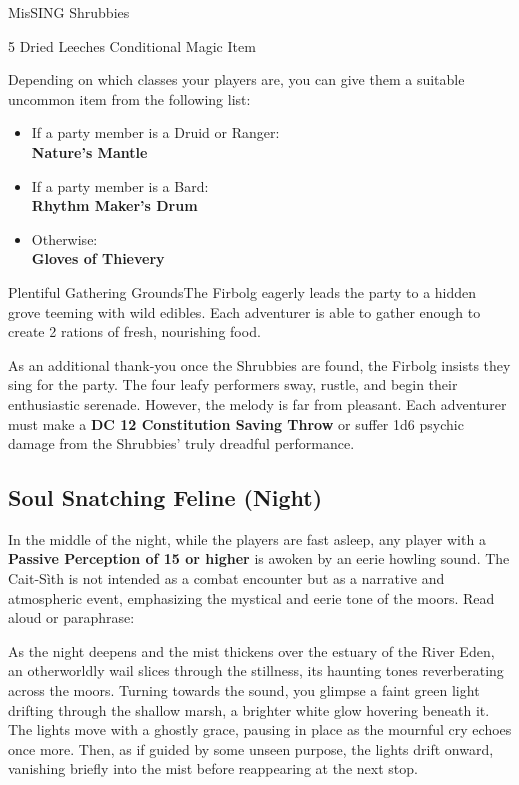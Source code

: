 \begin{DndQuestHook}[width=0.5\textwidth - 4pt]{{\large Mis}SING Shrubbies}
	{%
		{5 Dried Leeches}{}%
		{Conditional Magic Item}{%
			Depending on which classes your players are, you can give them a suitable uncommon item from the following list:
			\begin{itemize}
				\item If a party member is a Druid or Ranger:\\
				\textbf{Nature's Mantle}
				\item If a party member is a Bard:\\
				\textbf{Rhythm Maker's Drum}
				\item Otherwise:\\
				\textbf{Gloves of Thievery}
			\end{itemize}
		}%
		{Plentiful Gathering Grounds}{The Firbolg eagerly leads the party to a hidden grove teeming with wild edibles. Each adventurer is able to gather enough to create 2 rations of fresh, nourishing food.}
	}%
\end{DndQuestHook}

{\noindent\entryfont As an additional thank-you once the Shrubbies are found, the Firbolg insists they sing for the party. The four leafy performers sway, rustle, and begin their enthusiastic serenade. However, the melody is far from pleasant. Each adventurer must make a \textbf{DC 12 Constitution Saving Throw} or suffer 1d6 psychic damage from the Shrubbies' truly dreadful performance.}

\subsection*{Soul Snatching Feline (Night)}
{\entryfont In the middle of the night, while the players are fast asleep, any player with a \textbf{Passive Perception of 15 or higher} is awoken by an eerie howling sound. The Cait-Sìth is not intended as a combat encounter but as a narrative and atmospheric event, emphasizing the mystical and eerie tone of the moors. Read aloud or paraphrase:}
\begin{DndReadAloud}
	As the night deepens and the mist thickens over the estuary of the River Eden, an otherworldly wail slices through the stillness, its haunting tones reverberating across the moors. Turning towards the sound, you glimpse a faint green light drifting through the shallow marsh, a brighter white glow hovering beneath it. The lights move with a ghostly grace, pausing in place as the mournful cry echoes once more. Then, as if guided by some unseen purpose, the lights drift onward, vanishing briefly into the mist before reappearing at the next stop.
\end{DndReadAloud}

